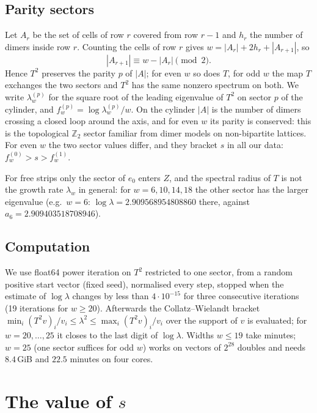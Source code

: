 \documentclass[11pt]{amsart}
\theoremstyle{definition}
\theoremstyle{remark}
\newcommand{\Z}{\mathbb{Z}}
\begin{document}
\subsection{Parity sectors}
Let $A_r$ be the set of cells of row $r$ covered from row $r - 1$ and $h_r$ the number of
dimers inside row $r$. Counting the cells of row $r$ gives $w = |A_r| + 2h_r + |A_{r+1}|$, so
\[
  |A_{r+1}| \equiv w - |A_r| \pmod 2.
\]
Hence $T^2$ preserves the parity $p$ of $|A|$; for even $w$ so does $T$, for odd $w$ the map $T$
exchanges the two sectors and $T^2$ has the same nonzero spectrum on both. We write
$\lambda^{(p)}_w$ for the square root of the leading eigenvalue of $T^2$ on sector $p$ of the
cylinder, and $f_w^{(p)} = \log \lambda^{(p)}_w / w$. On the cylinder $|A|$ is the number of
dimers crossing a closed loop around the axis, and for even $w$ its parity is conserved: this is
the topological $\Z_2$ sector familiar from dimer models on non-bipartite lattices. For even $w$
the two sector values differ, and they bracket $s$ in all our data: $f^{(0)}_w > s > f^{(1)}_w$.

For free strips only the sector of $e_0$ enters $Z$, and the spectral radius of $T$ is not the
growth rate $\lambda_w$ in general: for $w = 6, 10, 14, 18$ the other sector has the larger
eigenvalue (e.g.\ $w = 6$: $\log\lambda = 2.909568954808860$ there, against
$a_6 = 2.909403518708946$).

\subsection{Computation}
We use float64 power iteration on $T^2$ restricted to one sector, from a random positive start
vector (fixed seed), normalised every step, stopped when the estimate of $\log \lambda$ changes
by less than $4\cdot10^{-15}$ for three consecutive iterations (19 iterations for $w \ge 20$).
Afterwards the Collatz--Wielandt bracket $\min_i (T^2 v)_i / v_i \le \lambda^2 \le \max_i (T^2
v)_i / v_i$ over the support of $v$ is evaluated; for $w = 20, \dots, 25$ it closes to the last
digit of $\log \lambda$. Widths $w \le 19$ take minutes; $w = 25$ (one sector suffices for odd
$w$) works on vectors of $2^{28}$ doubles and needs $8.4$\,GiB and $22.5$ minutes on four cores.

\section{The value of \texorpdfstring{$s$}{s}}\label{sec:value}
\end{document}
